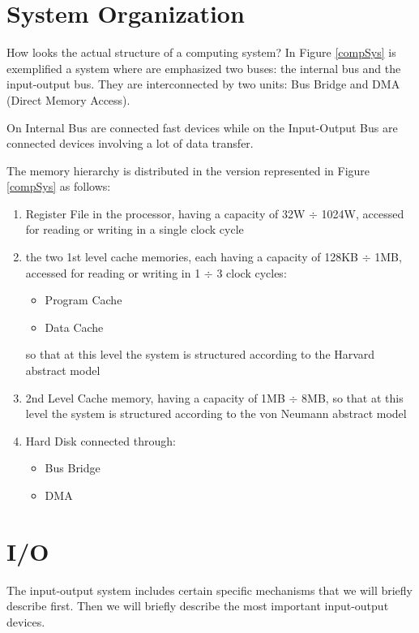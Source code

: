 \section{System Organization}

How looks the actual structure of a computing system? In Figure \ref{compSys} is exemplified a system where are emphasized two buses: the internal bus and the input-output bus. They are interconnected by two units: Bus Bridge and DMA (Direct Memory Access).


On Internal Bus are connected fast devices while on the Input-Output Bus are connected devices involving a lot of data transfer.

The memory hierarchy is distributed in the version represented in Figure \ref{compSys}  as follows:
\begin{enumerate}
    \item Register File in the processor, having a capacity of 32W $\div$ 1024W, accessed for reading or writing in a single clock cycle
    \item the two 1st level cache memories, each having a capacity of 128KB $\div$ 1MB, accessed for reading or writing in 1 $\div$ 3  clock cycles:
        \begin{itemize}
            \item Program Cache
            \item Data Cache
        \end{itemize}
        so that at this level the system is structured according to the Harvard abstract model
    \item 2nd Level Cache memory, having a capacity of 1MB $\div$ 8MB, so that at this level the system is structured according to the von Neumann abstract model
    \item Hard Disk connected through:
        \begin{itemize}
            \item Bus Bridge
            \item DMA
        \end{itemize}
\end{enumerate}


\section{I/O}

The input-output system includes certain specific mechanisms that we will briefly describe first. Then we will briefly describe the most important input-output devices.

